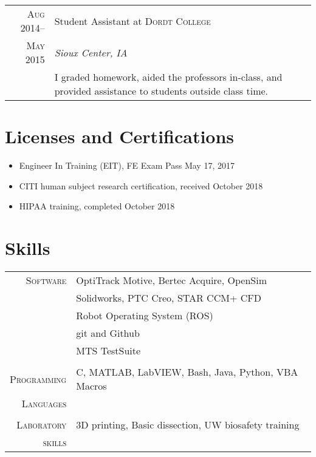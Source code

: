 \documentclass[a4paper,10pt]{article} %
\begin{document}
\begin{tabular}{r|p{11cm}}

\textsc{Aug 2014--} & Student Assistant at \textsc{Dordt College} \emph{}\\
\textsc{May 2015} & \emph{Sioux Center, IA} \\
& \footnotesize{
I graded homework, aided the professors in-class, and provided assistance to students outside class time.
} \\
\end{tabular}


\section{Licenses and Certifications}

\begin{itemize}
\item Engineer In Training (EIT), FE Exam Pass May 17, 2017
\item CITI human subject research certification, received October 2018
\item HIPAA training, completed October 2018
\end{itemize}


\section{Skills}

\begin{tabular}{rl}
\textsc{Software} & OptiTrack Motive, Bertec Acquire, OpenSim \\
& Solidworks, PTC Creo, STAR CCM+ CFD \\
& Robot Operating System (ROS) \\
& git and Github \\
& MTS TestSuite \\
\multicolumn{2}{c}{} \\

\textsc{Programming} & C, MATLAB, LabVIEW, Bash, Java, Python, VBA Macros \\
\textsc{Languages} &  \\
\multicolumn{2}{c}{} \\

\textsc{Laboratory} & 3D printing, Basic dissection, UW biosafety training \\
\textsc{skills} & \\

\end{tabular}
\end{document}
